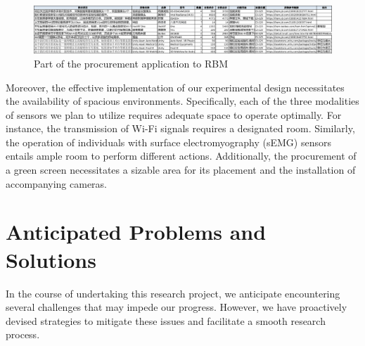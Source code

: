 \documentclass[12pt, a4paper]{article}
\begin{document}
\begin{figure}[ht!]
    \centering
    \includegraphics[width=1.0\textwidth]{image/procurement.pdf}
    \caption{Part of the procurement application to RBM}
    \label{fig:procurement}
\end{figure}

Moreover, the effective implementation of our experimental design necessitates the availability of spacious environments. Specifically, each of the three modalities of sensors we plan to utilize requires adequate space to operate optimally. For instance, the transmission of Wi-Fi signals requires a designated room. Similarly, the operation of individuals with surface electromyography (sEMG) sensors entails ample room to perform different actions. Additionally, the procurement of a green screen necessitates a sizable area for its placement and the installation of accompanying cameras.

\newpage
\section{Anticipated Problems and Solutions}
In the course of undertaking this research project, we anticipate encountering several challenges that may impede our progress. However, we have proactively devised strategies to mitigate these issues and facilitate a smooth research process.
\end{document}
